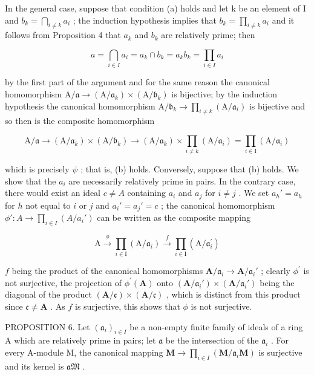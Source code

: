 In the general case, suppose that condition (a) holds and let k be an element of I and \(b_{k} = \bigcap_{i \neq k} a_{i}\) ; the induction hypothesis implies that \(b_{k} = \prod_{i \neq k} a_{i}\) and it follows from Proposition 4 that \(a_{k}\) and \(b_{k}\) are relatively prime; then

\[
a = \bigcap_ {i \in I} a _ {i} = a _ {k} \cap b _ {k} = a _ {k} b _ {k} = \prod_ {i \in I} a _ {i}
\]

by the first part of the argument and for the same reason the canonical homomorphism \(\mathrm{A}/\mathfrak{a}\to(\mathrm{A}/\mathfrak{a}_{k})\times(\mathrm{A}/\mathfrak{b}_{k})\) is bijective; by the induction hypothesis the canonical homomorphism \(\mathrm{A}/\mathfrak{b}_{k}\to\prod_{i\neq k}(\mathrm{A}/\mathfrak{a}_{i})\) is bijective and so then is the composite homomorphism

\[
\mathrm{A} / \mathfrak {a} \rightarrow (\mathrm{A} / \mathfrak {a} _ {k}) \times (\mathrm{A} / \mathfrak {b} _ {k}) \rightarrow (\mathrm{A} / \mathfrak {a} _ {k}) \times \prod_ {i \neq k} (\mathrm{A} / \mathfrak {a} _ {i}) = \prod_ {i \in \mathrm{I}} (\mathrm{A} / \mathfrak {a} _ {i})
\]

which is precisely \(\psi\) ; that is, (b) holds. Conversely, suppose that (b) holds. We show that the \(a_i\) are necessarily relatively prime in pairs. In the contrary case, there would exist an ideal \(c \neq A\) containing \(a_i\) and \(a_j\) for \(i \neq j\) . We set \(a_h' = a_h\) for \(h\) not equal to \(i\) or \(j\) and \(a_i' = a_j' = c\) ; the canonical homomorphism \(\phi': A \to \prod_{i \in I} (A / a_i')\) can be written as the composite mapping

\[
\mathrm{A} \xrightarrow {\phi} \prod_ {i \in \mathrm{I}} (\mathrm{A} / \mathfrak {a} _ {i}) \xrightarrow {f} \prod_ {i \in \mathrm{I}} (\mathrm{A} / \mathfrak {a} _ {i} ^ {\prime})
\]

\(f\) being the product of the canonical homomorphisms \(\mathbf{A} / \mathfrak{a}_i\to \mathbf{A} / \mathfrak{a}_i'\) ; clearly \(\phi^{\prime}\) is not surjective, the projection of \(\phi^{\prime}(\mathbf{A})\) onto \((\mathbf{A} / \mathfrak{a}_i')\times (\mathbf{A} / \mathfrak{a}_i')\) being the diagonal of the product \((\mathbf{A} / \mathfrak{c})\times (\mathbf{A} / \mathfrak{c})\) , which is distinct from this product since \(\mathfrak{c}\neq \mathbf{A}\) . As \(f\) is surjective, this shows that \(\phi\) is not surjective.

PROPOSITION 6. Let \((\mathfrak{a}_i)_{i\in I}\) be a non-empty finite family of ideals of a ring A which are relatively prime in pairs; let \(\mathfrak{a}\) be the intersection of the \(\mathfrak{a}_i\) . For every A-module M, the canonical mapping \(\mathbf{M} \to \prod_{i\in I} (\mathbf{M} / \mathfrak{a}_i\mathbf{M})\) is surjective and its kernel is \(\mathfrak{aM}\) .


